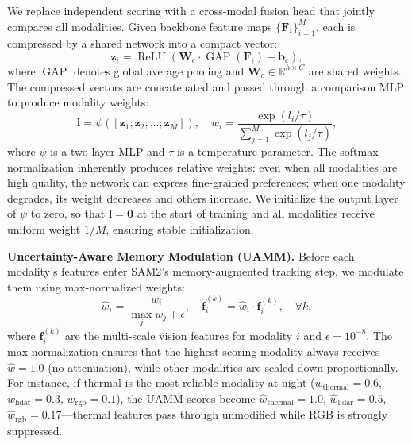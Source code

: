 We replace independent scoring with a cross-modal fusion head that jointly compares all modalities.
Given backbone feature maps $\{\mathbf{F}_i\}_{i=1}^{M}$, each is compressed by a shared network into a compact vector:
\begin{equation}
  \mathbf{z}_i = \operatorname{ReLU}(\mathbf{W}_c \cdot \operatorname{GAP}(\mathbf{F}_i) + \mathbf{b}_c),
  \label{eq:compress}
\end{equation}
where $\operatorname{GAP}$ denotes global average pooling and $\mathbf{W}_c \in \mathbb{R}^{h \times C}$ are shared weights.
The compressed vectors are concatenated and passed through a comparison MLP to produce modality weights:
\begin{equation}
  \mathbf{l} = \psi([\mathbf{z}_1; \mathbf{z}_2; \ldots; \mathbf{z}_M]),
  \quad w_i = \frac{\exp(l_i / \tau)}{\sum_{j=1}^{M} \exp(l_j / \tau)},
  \label{eq:cross_modal}
\end{equation}
where $\psi$ is a two-layer MLP and $\tau$ is a temperature parameter.
The softmax normalization inherently produces relative weights: even when all modalities are high quality, the network can express fine-grained preferences; when one modality degrades, its weight decreases and others increase.
We initialize the output layer of $\psi$ to zero, so that $\mathbf{l} = \mathbf{0}$ at the start of training and all modalities receive uniform weight $1/M$, ensuring stable initialization.

\noindent\textbf{Uncertainty-Aware Memory Modulation (UAMM).}
Before each modality's features enter SAM2's memory-augmented tracking step, we modulate them using max-normalized weights:
\begin{equation}
  \hat{w}_i = \frac{w_i}{\max_{j} w_j + \epsilon},
  \quad \hat{\mathbf{f}}_i^{(k)} = \hat{w}_i \cdot \mathbf{f}_i^{(k)}, \quad \forall k,
  \label{eq:uamm}
\end{equation}
where $\mathbf{f}_i^{(k)}$ are the multi-scale vision features for modality $i$ and $\epsilon = 10^{-8}$.
The max-normalization ensures that the highest-scoring modality always receives $\hat{w} = 1.0$ (no attenuation), while other modalities are scaled down proportionally.
For instance, if thermal is the most reliable modality at night ($w_\text{thermal} = 0.6$, $w_\text{lidar} = 0.3$, $w_\text{rgb} = 0.1$), the UAMM scores become $\hat{w}_\text{thermal} = 1.0$, $\hat{w}_\text{lidar} = 0.5$, $\hat{w}_\text{rgb} = 0.17$---thermal features pass through unmodified while RGB is strongly suppressed.

